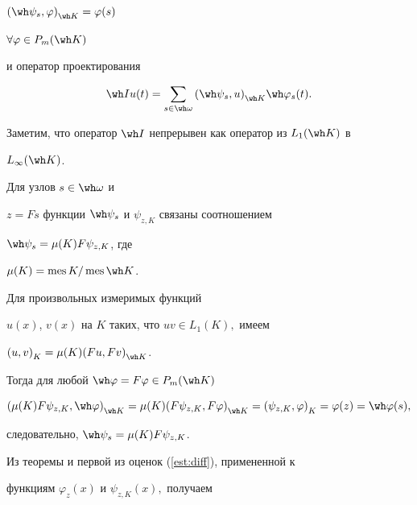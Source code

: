 ${(\wh \psi_s, \varphi)}_{\wh K} = \varphi(s)$


$\forall \varphi \in P_m(\wh K)$ 


и оператор проектирования 


$$


\wh I u(t) = \sum_{s\in\wh\omega}{(\wh \psi_s,u)}_{\wh K} \wh \varphi_s(t).


$$


Заметим, что оператор $\wh I$ непрерывен как оператор из $L_1(\wh K)$ в 


$L_\infty(\wh K)$. 





\begin{thm} \label{phipsi} Для узлов $s \in \wh \omega$ и 


$z=Fs$ функции $\wh \psi_s$ и $\psi_{z,K}$ связаны соотношением 


$\wh \psi_s=\mu(K)F \psi_{z,K}$, где 


$\mu(K)=\mes K/ \mes\wh K$.


\end{thm}





\begin{pf}


Для произвольных измеримых функций 


$u(x)$, $v(x)$ на $K$ таких, что $uv \in L_1(K),$ имеем 


${(u,v)}_K=\mu(K){(Fu,Fv)}_{\wh K}$.


Тогда для любой $\wh \varphi=F\varphi \in P_m(\wh K)$ 


$$


{(\mu(K)F\psi_{z,K},\wh \varphi)}_{\wh K}=


\mu(K){(F\psi_{z,K},F\varphi)}_{\wh K}


={(\psi_{z,K},\varphi)}_K=\varphi(z)=\wh \varphi(s),


$$ 


следовательно, $\wh \psi_s=\mu(K)F \psi_{z,K}$.


\end{pf}





Из теоремы и первой из оценок (\ref{est:diff}), примененной к 


функциям $\varphi_z(x)$ и $\psi_{z,K}(x),$ получаем 


\medskip





